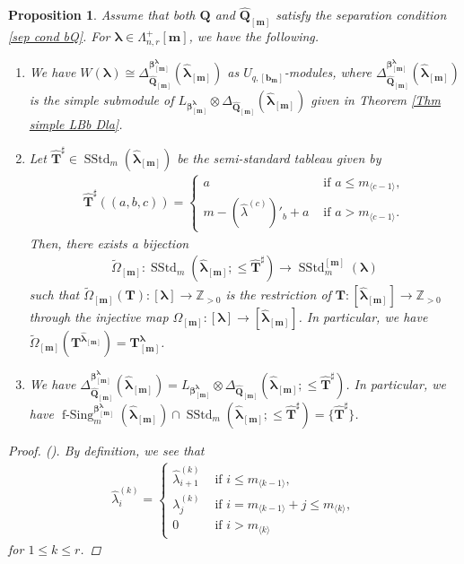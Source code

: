 \documentclass[12pt]{amsart}
\newtheorem{prop}[thm]{Proposition}
\numberwithin{equation}{thm}
\newcommand\ZZ{\mathbb Z}
\newcommand\bQ{\mathbf Q}
\newcommand\bT{\mathbf T}
\newcommand\bb{\mathbf b}
\renewcommand\bm{\mathbf m} %
\newcommand\la{\lambda}
\newcommand\D{\Delta}
\newcommand\Om{\Omega}
\newcommand\vL{\varLambda}
\newcommand\Bb{\boldsymbol\beta}
\newcommand\Bla{\boldsymbol\lambda}
\newcommand\wh{\widehat}
\newcommand\wt{\widetilde}
\newcommand\ra{\rightarrow}
\newcommand\lan{\langle}
\newcommand\ran{\rangle}
\newcommand{\SStd}{\operatorname{SStd}}
\newcommand{\fSing}{\operatorname{f-Sing}}
\newcounter{ichi}
\newcommand{\roi}{\roman{ichi}}
\newcounter{ni}
\begin{document}
\begin{prop}
\label{Prop WBla D wh Bla}
Assume that  both $\bQ$ and $\wh{\bQ}_{[\bm]}$ satisfy the separation condition \eqref{sep cond bQ}. 
For $\Bla \in \vL_{n,r}^+[\bm]$, we have the following. 
\begin{enumerate} 
\item 
We have $W(\Bla)  \cong \D_{\wh{\bQ}_{[\bm]}}^{\Bb^{\Bla}_{[\bm]}} (\wh{\Bla}_{[\bm]}) $
as  $U_{q,[\bb_{\bm}]}$-modules, 
where $\D_{\wh{\bQ}_{[\bm]}}^{\Bb^{\Bla}_{[\bm]}} (\wh{\Bla}_{[\bm]})$ is the simple submodule of 
$L_{\Bb_{[\bm]}^{\Bla}} \otimes \D_{\wh{\bQ}_{[\bm]}}(\wh{\Bla}_{[\bm]})$ given in Theorem \ref{Thm simple LBb Dla}. 

\item 
Let $\wh{\bT}^{\sharp}  \in \SStd_m (\wh{\Bla}_{[\bm]})$ be the semi-standard tableau given by 
\begin{align*}
\wh{\bT}^{\sharp} ((a,b,c)) = \begin{cases}
	a & \text{ if } a \leq m_{\lan c-1 \ran}, 
	\\
	m - (\wh{\la}^{(c)})'_b +a & \text{ if } a > m_{\lan c-1 \ran}. 
	\end{cases}
\end{align*}
Then, there exists  a bijection 
\begin{align*}
\wt{\Om}_{[\bm]} : \SStd_m (\wh{\Bla}_{[\bm]} ; \leq \wh{\bT}^{\sharp}) \ra \SStd_m^{[\bm]}(\Bla)
\end{align*} 
such that 
$\wt{\Om}_{[\bm]} ( \bT) : [\Bla] \ra \ZZ_{ > 0}$ is  the restriction of $\bT : [\wh{\Bla}_{[\bm]}] \ra \ZZ_{>0}$ 
through the injective map $\Om_{[\bm]} : [\Bla] \ra [\wh{\Bla}_{[\bm]}]$. 
In particular, we have 
$\wt{\Om}_{[\bm]} (\bT^{\wh{\Bla}_{[\bm]}}) = \bT^{\Bla}_{[\bm]}$.  

\item 
We have $\D_{\wh{\bQ}_{[\bm]}}^{\Bb^{\Bla}_{[\bm]}} (\wh{\Bla}_{[\bm]}) 
=L_{\Bb_{[\bm]}^{\Bla}} \otimes \D_{\wh{\bQ}_{[\bm]}}(\wh{\Bla}_{[\bm]} ; \leq \wh{\bT}^{\sharp})$. 
In particular, we have 
$\fSing_m^{\Bb_{[\bm]}^{\Bla}} (\wh{\Bla}_{[\bm]}) \cap \SStd_m (\wh{\Bla}_{[\bm]} ; \leq \wh{\bT}^{\sharp}) 
	= \{ \wh{\bT}^{\sharp } \}$. 
\end{enumerate} 
\begin{proof} 
(\roi). 
By definition,  we see that 
\begin{align}
\label{wh la c i} 
\wh{\la}_i^{(k)} = \begin{cases}   
	\wh{\la}_{i+1}^{(k)} & \text{ if } i \leq m_{\lan k-1 \ran}, 
	\\
	\la_j^{(k)} & \text{ if } i =m_{\lan k-1 \ran} +j \leq m_{\lan k \ran}, 
	\\ 
	0 & \text{ if } i > m_{\lan k \ran} 
	\end{cases}
\end{align}
for $1 \leq k \leq r$. 


\end{proof}
\end{prop}
\end{document}
